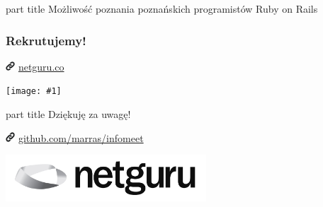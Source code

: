 \documentclass{beamer}
\newcommand{\myfullimage}[1]{%
    \hspace*{-1.1cm}
    \texttt{[image: \#1]}
}
\newcommand{\myurl}[1]{%
    \begin{block}{}
       \centering \huge
       \includegraphics[width=0.35cm]{link.png}
       \hspace{0.1cm}
       \url{#1}
    \end{block}
}
\newcommand{\mytitle}[1]{%
    \begin{frame}[plain]
        \begin{centering}
        \vspace{1em}\par
            \begin{beamercolorbox}[rounded=true,sep=4pt,center]{part title}
               \huge #1
            \end{beamercolorbox}
        \end{centering}
    \end{frame}
}
\begin{document}
\mytitle{Możliwość poznania poznańskich programistów Ruby on Rails}

\begin{frame}[fragile]
\frametitle{Rekrutujemy!}
\myurl{netguru.co}
\myfullimage{rekrutacja.png}
\end{frame}

\begin{frame}[plain]
\begin{centering}
    \vspace{1em}\par
        \begin{beamercolorbox}[rounded=true,sep=4pt,center]{part title}
           \huge Dziękuję za uwagę!
        \end{beamercolorbox}
    \vspace{0.5cm}
    \myurl{github.com/marras/infomeet}
    \vspace{1.5cm}
    \includegraphics[width=7.5cm]{netguru_logo.jpg} \par
\end{centering}
\end{frame}
\end{document}
